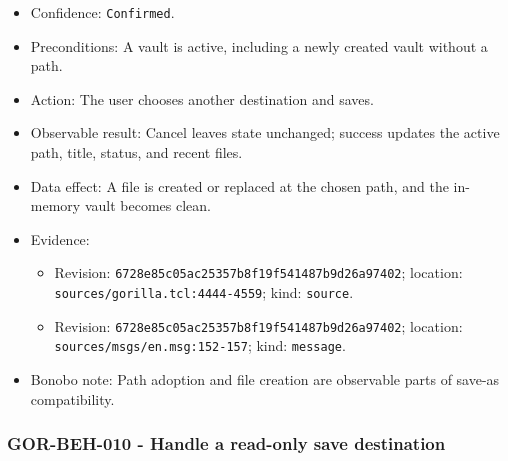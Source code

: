 \documentclass[
  letterpaper,
]{article}
\newcommand{\passthrough}[1]{#1}
\providecommand{\tightlist}{%
  \setlength{\itemsep}{0pt}\setlength{\parskip}{0pt}}
\begin{document}
\begin{itemize}
\tightlist
\item
  Confidence: \passthrough{\lstinline!Confirmed!}.
\item
  Preconditions: A vault is active, including a newly created vault without a path.
\item
  Action: The user chooses another destination and saves.
\item
  Observable result: Cancel leaves state unchanged; success updates the active path, title, status, and recent files.
\item
  Data effect: A file is created or replaced at the chosen path, and the in-memory vault becomes clean.
\item
  Evidence:

  \begin{itemize}
  \tightlist
  \item
    Revision: \nolinkurl{6728e85c05ac25357b8f19f541487b9d26a97402}; location: \nolinkurl{sources/gorilla.tcl:4444-4559};
    kind: \passthrough{\lstinline!source!}.
  \item
    Revision: \nolinkurl{6728e85c05ac25357b8f19f541487b9d26a97402}; location: \nolinkurl{sources/msgs/en.msg:152-157};
    kind: \passthrough{\lstinline!message!}.
  \end{itemize}
\item
  Bonobo note: Path adoption and file creation are observable parts of save-as compatibility.
\end{itemize}

\subsubsection{GOR-BEH-010 - Handle a read-only save
destination}\label{gor-beh-010---handle-a-read-only-save-destination}
\end{document}
